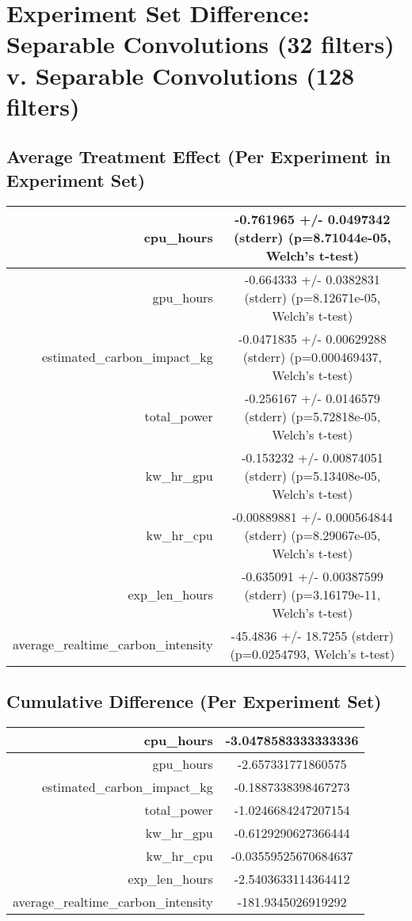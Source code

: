 \documentclass{article}%
\begin{document}
%
\normalsize%
\section{Experiment Set Difference: Separable Convolutions (32 filters) v. Separable Convolutions (128 filters)}%
\label{sec:Experiment Set Difference Separable Convolutions (32 filters) v. Separable Convolutions (128 filters)}%
\subsection{Average Treatment Effect (Per Experiment in Experiment Set)}%
\label{subsec:Average Treatment Effect (Per Experiment in Experiment Set)}%
\begin{tabular}{|r|c|}%
\hline%
cpu\_hours&{-}0.761965 +/{-} 0.0497342 (stderr) (p=8.71044e{-}05, Welch's t{-}test)\\%
\hline%
gpu\_hours&{-}0.664333 +/{-} 0.0382831 (stderr) (p=8.12671e{-}05, Welch's t{-}test)\\%
\hline%
estimated\_carbon\_impact\_kg&{-}0.0471835 +/{-} 0.00629288 (stderr) (p=0.000469437, Welch's t{-}test)\\%
\hline%
total\_power&{-}0.256167 +/{-} 0.0146579 (stderr) (p=5.72818e{-}05, Welch's t{-}test)\\%
\hline%
kw\_hr\_gpu&{-}0.153232 +/{-} 0.00874051 (stderr) (p=5.13408e{-}05, Welch's t{-}test)\\%
\hline%
kw\_hr\_cpu&{-}0.00889881 +/{-} 0.000564844 (stderr) (p=8.29067e{-}05, Welch's t{-}test)\\%
\hline%
exp\_len\_hours&{-}0.635091 +/{-} 0.00387599 (stderr) (p=3.16179e{-}11, Welch's t{-}test)\\%
\hline%
average\_realtime\_carbon\_intensity&{-}45.4836 +/{-} 18.7255 (stderr) (p=0.0254793, Welch's t{-}test)\\%
\hline%
\end{tabular}

%
\subsection{Cumulative Difference (Per Experiment Set)}%
\label{subsec:Cumulative Difference (Per Experiment Set)}%
\begin{tabular}{|r|c|}%
\hline%
cpu\_hours&{-}3.0478583333333336\\%
\hline%
gpu\_hours&{-}2.657331771860575\\%
\hline%
estimated\_carbon\_impact\_kg&{-}0.1887338398467273\\%
\hline%
total\_power&{-}1.0246684247207154\\%
\hline%
kw\_hr\_gpu&{-}0.6129290627366444\\%
\hline%
kw\_hr\_cpu&{-}0.03559525670684637\\%
\hline%
exp\_len\_hours&{-}2.5403633114364412\\%
\hline%
average\_realtime\_carbon\_intensity&{-}181.9345026919292\\%
\hline%
\end{tabular}

%
\end{document}
